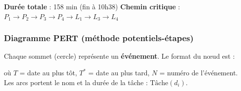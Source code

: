 \documentclass[12pt,a4paper]{article}
\begin{document}
\medskip
\noindent\textbf{Durée totale} : 158 min (fin à 10h38)\quad
\textbf{Chemin critique} : $P_1\to P_2\to P_3\to P_4\to L_1\to L_3\to L_4$

\subsubsection{Diagramme PERT (méthode potentiels-étapes)}

Chaque sommet (cercle) représente un \textbf{événement}. Le format du nœud est :
\begin{center}
\end{center}
où $T$ = date au plus tôt, $T^*$ = date au plus tard, $N$ = numéro de l'événement.
Les arcs portent le nom et la durée de la tâche : $\text{Tâche}(d_i)$.
\end{document}
